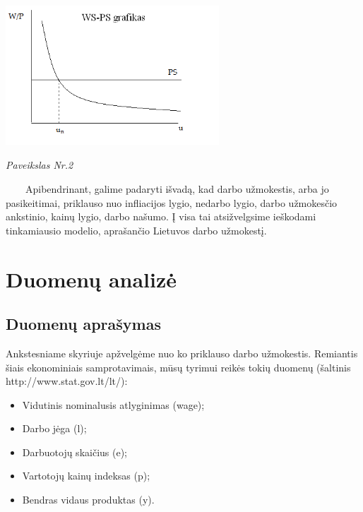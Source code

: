 \documentclass[12pt,a4paper]{article}
\theoremstyle{change}\newtheorem{salyga}{Uždavinys}
\begin{document}
\begin{center}
\includegraphics[width=80mm,height=60mm]{wsps.PNG}
\\
\textit{Paveikslas Nr.2}
\end{center}

\vskip 8pt
$\qquad $Apibendrinant, galime padaryti išvadą, kad darbo užmokestis, arba jo pasikeitimai, priklauso nuo infliacijos lygio, nedarbo lygio, darbo užmokesčio ankstinio, kainų lygio, darbo našumo. Į visa tai atsižvelgsime ieškodami tinkamiausio modelio, aprašančio Lietuvos darbo užmokestį.

\pagebreak









\section{Duomenų analizė}
\bigskip





\subsection{Duomenų aprašymas}
\medskip
\hspace{40pt}Ankstesniame skyriuje apžvelgėme nuo ko priklauso darbo užmokestis. Remiantis šiais ekonominiais samprotavimais, mūsų tyrimui reikės tokių duomenų (šaltinis http://www.stat.gov.lt/lt/):

\medskip

\begin{itemize}
\item Vidutinis nominalusis atlyginimas (wage);
\item Darbo jėga (l);
\item Darbuotojų skaičius (e);
\item Vartotojų kainų indeksas (p);
\item Bendras vidaus produktas (y).
\end{itemize}
\end{document}

